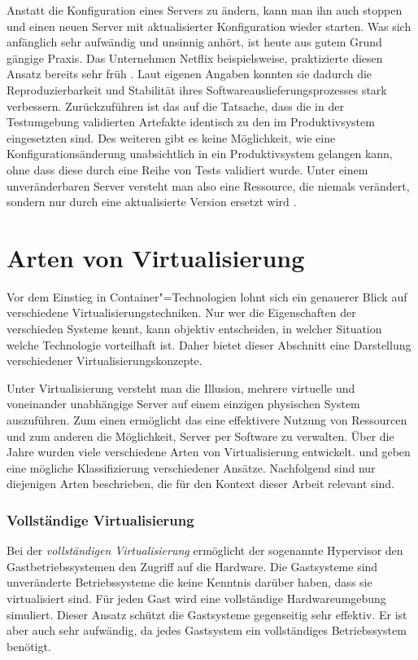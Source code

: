 Anstatt die Konfiguration eines Servers zu ändern, kann man ihn auch stoppen und einen neuen Server mit aktualisierter Konfiguration wieder starten. Was sich anfänglich sehr aufwändig und unsinnig anhört, ist heute aus gutem Grund gängige Praxis. Das Unternehmen Netflix beispielsweise, praktizierte diesen Ansatz bereits sehr früh \cite{NflxLegos}. Laut eigenen Angaben konnten sie dadurch die Reproduzierbarkeit und Stabilität ihres Softwareauslieferungsprozesses stark verbessern. Zurückzuführen ist das auf die Tatsache, dass die in der Testumgebung validierten Artefakte identisch zu den im Produktivsystem eingesetzten sind. Des weiteren gibt es keine Möglichkeit, wie eine Konfigurationsänderung unabsichtlich in ein Produktivsystem gelangen kann, ohne dass diese durch eine Reihe von Tests validiert wurde. Unter einem unveränderbaren Server versteht man also eine Ressource, die niemals verändert, sondern nur durch eine aktualisierte Version ersetzt wird \cite{ImmutableServer}.

\section{Arten von Virtualisierung}

Vor dem Einstieg in Container"=Technologien lohnt sich ein genauerer Blick auf verschiedene Virtualisierungstechniken. Nur wer die Eigenschaften der verschieden Systeme kennt, kann objektiv entscheiden, in welcher Situation welche Technologie vorteilhaft ist. Daher bietet dieser Abschnitt eine Darstellung verschiedener Virtualisierungskonzepte.

Unter Virtualisierung versteht man die Illusion, mehrere virtuelle und voneinander unabhängige Server auf einem einzigen physischen System auszuführen. Zum einen ermöglicht das eine effektivere Nutzung von Ressourcen und zum anderen die Möglichkeit, Server per Software zu verwalten. Über die Jahre wurden viele verschiedene Arten von Virtualisierung entwickelt. \cite{VirtualizationBasics} und \cite{Smith:2005:AVM:1069588.1069632} geben eine mögliche Klassifizierung verschiedener Ansätze.
Nachfolgend sind nur diejenigen Arten beschrieben, die für den Kontext dieser Arbeit relevant sind.

\subsubsection{Vollständige Virtualisierung}

Bei der \textit{vollständigen Virtualisierung} ermöglicht der sogenannte Hypervisor den Gastbetriebssystemen den Zugriff auf die Hardware. Die Gastsysteme sind unveränderte Betriebssysteme die keine Kenntnis darüber haben, dass sie virtualisiert sind. Für jeden Gast wird eine vollständige Hardwareumgebung simuliert. Dieser Ansatz schützt die Gastsysteme gegenseitig sehr effektiv. Er ist aber auch sehr aufwändig, da jedes Gastsystem ein vollständiges Betriebssystem benötigt.

